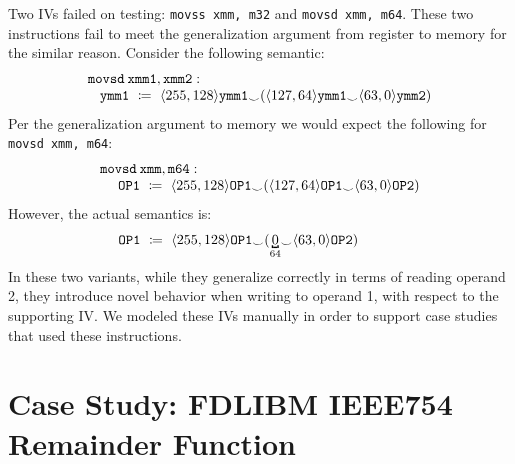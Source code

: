 Two IVs failed on testing: \texttt{movss xmm, m32} and \texttt{movsd xmm, m64}. 
These two instructions fail to meet the generalization argument from register to memory for the similar reason.
Consider the following semantic:
\[
\begin{array}{l}
\mathtt{movsd\hspace{0.5ex} xmm1,xmm2}: \\
\mbox{\hspace{2ex}}\mathtt{ymm1} ~\coloneqq~ \langle 255,128\rangle \mathtt{ymm1} {_\smile} (\langle 127,64\rangle \mathtt{ymm1} {_\smile} \langle 63,0\rangle \mathtt{ymm2})\\ 
\end{array}
\]
Per the generalization argument to memory we would expect the following for \texttt{movsd xmm, m64}:
\[
\begin{array}{l}
\mathtt{movsd\hspace{0.5ex} xmm,m64}: \\
\mbox{\hspace{3ex}}\mathtt{OP1} ~\coloneqq~ \langle 255,128\rangle \mathtt{OP1} {_\smile} (\langle 127,64\rangle \mathtt{OP1} {_\smile} \langle 63,0\rangle \mathtt{OP2})\\ 
\end{array}
\]
However, the actual semantics is:
\[
\begin{array}{l}
\mathtt{OP1}~\coloneqq~ \langle 255,128\rangle\mathtt{OP1} _\smile (\bitmoded{64}{0} {_\smile} \langle 63,0\rangle \mathtt{OP2})\mbox{\hspace{7ex}}
\end{array}
\]
In these two variants, while they generalize correctly in terms of reading operand 2, they introduce novel behavior when writing to operand 1, with respect to the supporting IV. We modeled these IVs manually in order to support case studies that used these instructions.

\section{Case Study: FDLIBM IEEE754 Remainder Function}



